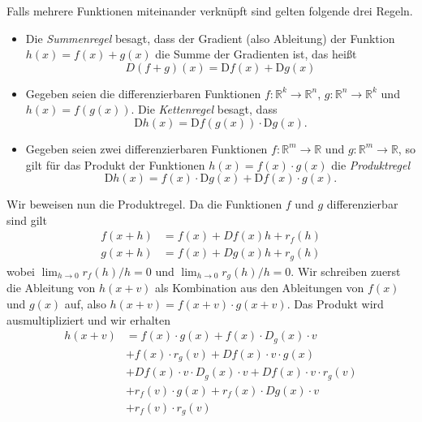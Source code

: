 Falls mehrere Funktionen miteinander verknüpft sind gelten folgende drei Regeln.
\begin{itemize}
\item Die \emph{Summenregel} besagt, dass der Gradient (also Ableitung) der Funktion $h(x)=f(x)+g(x)$ die Summe der Gradienten ist, das heißt
\begin{equation*} D(f + g)(x)=\text{D} f(x)+\text{D} g(x)\end{equation*}

\item Gegeben seien die differenzierbaren Funktionen $f:\mathbb{R}^k\rightarrow\mathbb{R}^n$, $g:\mathbb{R}^n\rightarrow\mathbb{R}^k$ und $h(x)=f(g(x))$. Die \emph{Kettenregel} besagt, dass
\begin{equation*}
\text{D}h(x) = \text{D}f(g(x)) \cdot \text{D} g(x).
\end{equation*}

\item Gegeben seien zwei differenzierbaren Funktionen $f:\mathbb{R}^m\rightarrow\mathbb{R}$ und $g:\mathbb{R}^m\rightarrow\mathbb{R}$, so gilt für das Produkt der Funktionen $h(x)=f(x) \cdot g(x)$ die \emph{Produktregel} \begin{equation*}\text{D}h(x)=f(x) \cdot \text{D}g(x)+\text{D}f(x) \cdot g(x).\end{equation*}
 \end{itemize}
Wir beweisen nun die Produktregel.
Da die Funktionen $f$ und $g$ differenzierbar sind gilt
\begin{align*}
  f(x+h) &= f(x) +  Df(x) h + r_{f}(h)\\
  g(x+h) &= f(x) + Dg(x) h + r_{g}(h)
\end{align*}
wobei $\lim_{h\rightarrow 0} r_f(h)/h = 0$ und $\lim_{h\rightarrow 0} r_g(h)/h = 0$.
Wir schreiben zuerst die Ableitung von $h(x+v)$ als Kombination aus den Ableitungen von $f(x)$ und $g(x)$ auf, also $h(x+v) =  f(x+v)\cdot g(x+v)$.
Das Produkt wird ausmultipliziert und wir erhalten
\begin{equation*}
\begin{split} h(x+v) & = f(x) \cdot g(x)  + f(x)  \cdot D_{g}(x) \cdot v \\ & + f(x) \cdot r_{g}(v) + Df(x) \cdot v \cdot g(x) \\ & +  Df(x) \cdot v \cdot D_{g}(x) \cdot v  + Df(x) \cdot v \cdot r_{g}(v) \\ & +  r_{f}(v) \cdot g(x) + r_{f}(x) \cdot Dg(x) \cdot v \\ & + r_{f}(v) \cdot r_{g}(v) \end{split} \end{equation*}   %

